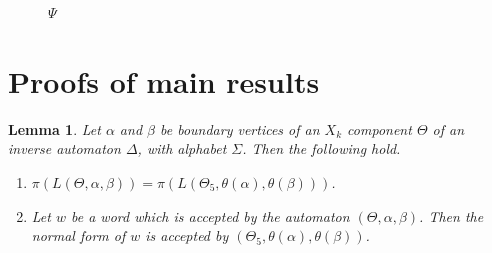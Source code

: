 \documentclass[a4paper,12pt]{article}
\renewcommand{\a}{\alpha }
\renewcommand{\b}{\beta }
\newcommand{\D}{\Delta }
\newcommand{\T}{\Theta }
\renewcommand{\S}{\Sigma }
\newtheorem{lemma}[theorem]{Lemma}
\numberwithin{equation}{section}
\numberwithin{figure}{section}
\newcommand{\be}{\begin{enumerate}}
\newcommand{\ee}{\end{enumerate}}
\begin{document}
\begin{figure}
\begin{center}
\caption{$\Psi$}
\label{fig:out}
\end{center}
\end{figure}

\section{Proofs of main results}
\begin{lemma}\label{lem:nfcomp} 
Let $\a$ and $\b$ be boundary vertices of  an $X_k$ component $\T$ of
an inverse automaton $\D$, with alphabet $\S$. Then   the following hold.
\be
\item\label{it:nfcomp1}
  $\pi(L(\T,\a,\b))=\pi(L(\T_5,\theta(\a),\theta(\b)))$.
\item\label{it:nfcomp2} Let $w$ be a word
 which is accepted by the automaton $(\T, \a, \b)$. Then the
normal form of $w$ is accepted by $(\T_5, \theta(\a), \theta(\b))$.
\ee
\end{lemma}
\end{document}
